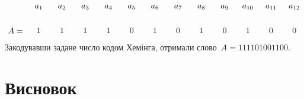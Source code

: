 \documentclass[
	a4paper,
	oneside,
	BCOR = 10mm,
	DIV = 12,
	12pt,
	headings = normal,
]{scrartcl}
\begin{document}
			\[
				\begin{tikzpicture}
					\node (a01) at (0,0)        {1};
					\node[right of = a01] (a02) {1};
					\node[right of = a02] (a03) {1};
					\node[right of = a03] (a04) {1};
					\node[right of = a04] (a05) {0};
					\node[right of = a05] (a06) {1};
					\node[right of = a06] (a07) {0};
					\node[right of = a07] (a08) {1};
					\node[right of = a08] (a09) {0};
					\node[right of = a09] (a10) {1};
					\node[right of = a10] (a11) {0};
					\node[right of = a11] (a12) {0};
					\node[left of = a01] (A)   {$A = $};

					\node[above of = a01] (a01_t) {$a_{1}$};
					\node[above of = a02] (a02_t) {$a_{2}$};
					\node[above of = a03] (a03_t) {$a_{3}$};
					\node[above of = a04] (a04_t) {$a_{4}$};
					\node[above of = a05] (a05_t) {$a_{5}$};
					\node[above of = a06] (a06_t) {$a_{6}$};
					\node[above of = a07] (a07_t) {$a_{7}$};
					\node[above of = a08] (a08_t) {$a_{8}$};
					\node[above of = a09] (a09_t) {$a_{9}$};
					\node[above of = a10] (a10_t) {$a_{10}$};
					\node[above of = a11] (a11_t) {$a_{11}$};
					\node[above of = a12] (a12_t) {$a_{12}$};
				\end{tikzpicture}
			\]
			Закодувавши задане число кодом Хемінга, отримали слово~$A = 111101001100$.

	\section{Висновок}
\end{document}

